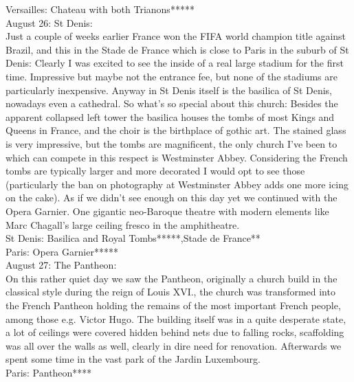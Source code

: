 Versailles: Chateau with both Trianons*****\\

August 26: St Denis:\\
Just a couple of weeks earlier France won the FIFA world champion title against Brazil, and this in the Stade de France which is close to Paris in the suburb of St Denis: Clearly I was excited to see the inside of a real large stadium for the first time. Impressive but maybe not the entrance fee, but none of the stadiums are particularly inexpensive. Anyway in St Denis itself is the basilica of St Denis, nowadays even a cathedral. So what's so special about this church: Besides the apparent collapsed left tower the basilica houses the tombs of most Kings and Queens in France, and the choir is the birthplace of gothic art. The stained glass is very impressive, but the tombs are magnificent, the only church I've been to which can compete in this respect is Westminster Abbey. Considering the French tombs are typically larger and more decorated I would opt to see those (particularly the ban on photography at Westminster Abbey adds one more icing on the cake). As if we didn't see enough on this day yet we continued with the Opera Garnier. One gigantic neo-Baroque theatre with modern elements like Marc Chagall's large ceiling fresco in the amphitheatre.\\

St Denis: Basilica and Royal Tombs*****,Stade de France**\\
Paris: Opera Garnier*****\\

August 27: The Pantheon:\\
On this rather quiet day we saw the Pantheon, originally a church build in the classical style during the reign of Louis XVI., the church was transformed into the French Pantheon holding the remains of the most important French people, among those e.g. Victor Hugo. The building itself was in a quite desperate state, a lot of ceilings were covered hidden behind nets due to falling rocks, scaffolding was all over the walls as well, clearly in dire need for renovation. Afterwards we spent some time in the vast park of the Jardin Luxembourg.\\

Paris: Pantheon****\\

